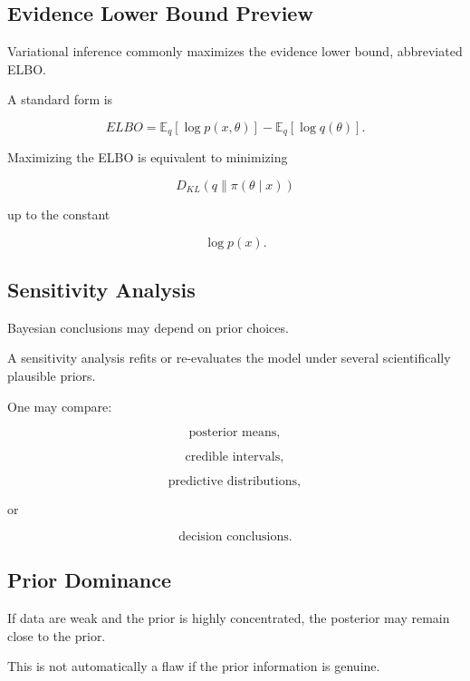 \subsection{Evidence Lower Bound Preview}
\label{subsec:elbo-preview}

Variational inference commonly maximizes the evidence lower bound,
abbreviated ELBO.

A standard form is

\[
\boxed{
ELBO
=
\mathbb{E}_q
[
\log p(x,\theta)
]
-
\mathbb{E}_q
[
\log q(\theta)
].
}
\]

Maximizing the ELBO is equivalent to minimizing

\[
D_{KL}
(
q
\|
\pi(\theta\mid x)
)
\]

up to the constant

\[
\log p(x).
\]

\subsection{Sensitivity Analysis}
\label{subsec:bayesian-sensitivity-analysis}

Bayesian conclusions may depend on prior choices.

A sensitivity analysis refits or re-evaluates the model under several
scientifically plausible priors.

One may compare:

\[
\boxed{
\text{posterior means},
}
\]

\[
\boxed{
\text{credible intervals},
}
\]

\[
\boxed{
\text{predictive distributions},
}
\]

or

\[
\boxed{
\text{decision conclusions}.
}
\]

\subsection{Prior Dominance}
\label{subsec:prior-dominance}

If data are weak and the prior is highly concentrated, the posterior may
remain close to the prior.

This is not automatically a flaw if the prior information is genuine.

